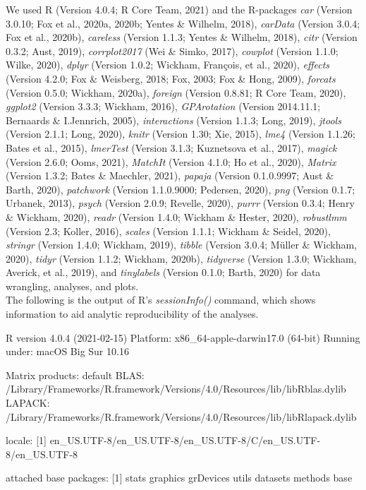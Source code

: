 \begin{appendix}
We used R (Version 4.0.4; R Core Team, 2021) and the R-packages
\emph{car} (Version 3.0.10; Fox et al., 2020a, 2020b; Yentes \& Wilhelm,
2018), \emph{carData} (Version 3.0.4; Fox et al., 2020b),
\emph{careless} (Version 1.1.3; Yentes \& Wilhelm, 2018), \emph{citr}
(Version 0.3.2; Aust, 2019), \emph{corrplot2017} (Wei \& Simko, 2017),
\emph{cowplot} (Version 1.1.0; Wilke, 2020), \emph{dplyr} (Version
1.0.2; Wickham, François, et al., 2020), \emph{effects} (Version 4.2.0;
Fox \& Weisberg, 2018; Fox, 2003; Fox \& Hong, 2009), \emph{forcats}
(Version 0.5.0; Wickham, 2020a), \emph{foreign} (Version 0.8.81; R Core
Team, 2020), \emph{ggplot2} (Version 3.3.3; Wickham, 2016),
\emph{GPArotation} (Version 2014.11.1; Bernaards \& I.Jennrich, 2005),
\emph{interactions} (Version 1.1.3; Long, 2019), \emph{jtools} (Version
2.1.1; Long, 2020), \emph{knitr} (Version 1.30; Xie, 2015), \emph{lme4}
(Version 1.1.26; Bates et al., 2015), \emph{lmerTest} (Version 3.1.3;
Kuznetsova et al., 2017), \emph{magick} (Version 2.6.0; Ooms, 2021),
\emph{MatchIt} (Version 4.1.0; Ho et al., 2020), \emph{Matrix} (Version
1.3.2; Bates \& Maechler, 2021), \emph{papaja} (Version 0.1.0.9997; Aust
\& Barth, 2020), \emph{patchwork} (Version 1.1.0.9000; Pedersen, 2020),
\emph{png} (Version 0.1.7; Urbanek, 2013), \emph{psych} (Version 2.0.9;
Revelle, 2020), \emph{purrr} (Version 0.3.4; Henry \& Wickham, 2020),
\emph{readr} (Version 1.4.0; Wickham \& Hester, 2020), \emph{robustlmm}
(Version 2.3; Koller, 2016), \emph{scales} (Version 1.1.1; Wickham \&
Seidel, 2020), \emph{stringr} (Version 1.4.0; Wickham, 2019),
\emph{tibble} (Version 3.0.4; Müller \& Wickham, 2020), \emph{tidyr}
(Version 1.1.2; Wickham, 2020b), \emph{tidyverse} (Version 1.3.0;
Wickham, Averick, et al., 2019), and \emph{tinylabels} (Version 0.1.0;
Barth, 2020) for data wrangling, analyses, and plots.\\
The following is the output of R's \emph{sessionInfo()} command, which
shows information to aid analytic reproducibility of the analyses.

R version 4.0.4 (2021-02-15) Platform: x86\_64-apple-darwin17.0 (64-bit)
Running under: macOS Big Sur 10.16

Matrix products: default BLAS:
/Library/Frameworks/R.framework/Versions/4.0/Resources/lib/libRblas.dylib
LAPACK:
/Library/Frameworks/R.framework/Versions/4.0/Resources/lib/libRlapack.dylib

locale: {[}1{]}
en\_US.UTF-8/en\_US.UTF-8/en\_US.UTF-8/C/en\_US.UTF-8/en\_US.UTF-8

attached base packages: {[}1{]} stats graphics grDevices utils datasets
methods base


\end{appendix}
